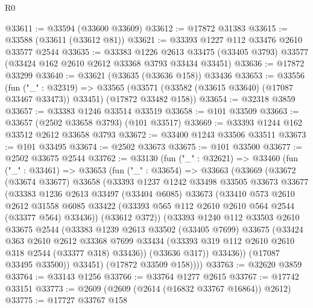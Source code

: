 \begin{lexlean}{R0}
\begin{coremodule}
@33611 := @33594 (@33600 @33609)
@33612 := @17872 @31383
@33615 := @33588 (@33611 (@33612 @81))
@33621 := @33393 @1227 @112 @33476 @2610 @33577 @2544
@33635 := @33383
    @1226
    @2613
    @33475
    (@33405 @3793)
    @33577
    (@33424 @162 @2610 @2612 @33368 @3793 @33434 @33451)
@33636 := @17872 @33299
@33640 := @33621 (@33635 (@33636 @158)) @33436
@33653 := @33556
    (fun ("_" : @32319) =>
    @33565 (@33571 (@33582 (@33615 @33640) (@17087 @33467 @33473)) @33451) (@17872 @33482 @158))
@33654 := @32318 @3859
@33657 := @33383 @1246 @33514 @33519
@33658 := @101 @33509
@33663 := @33657 (@2502 @33658 @3793) (@101 @33517)
@33669 := @33393 @1244 @162 @33512 @2612 @33658 @3793
@33672 := @33400 @1243 @33506 @33511
@33673 := @101 @33495
@33674 := @2502 @33673
@33675 := @101 @33500
@33677 := @2502 @33675 @2544
@33762 := @33130
    (fun ("_" : @32621) =>
    @33460
      (fun ("_" : @33461) =>
      @33653
        (fun ("_" : @33654) =>
        @33663
          (@33669
            (@33672
              (@33674 @33677)
              @33658
              (@33393
                @1237
                @1242
                @33498
                @33505
                @33673
                @33677
                (@33383
                  @1236
                  @2613
                  @33497
                  (@33404 @6085)
                  @33673
                  (@33410
                    @573
                    @2610
                    @2612
                    @31558
                    @6085
                    @33422
                    (@33393 @565 @112 @2610 @2610 @564 @2544 (@33377 @564) @33436))
                  (@33612 @372))
                (@33393
                  @1240
                  @112
                  @33503
                  @2610
                  @33675
                  @2544
                  (@33383
                    @1239
                    @2613
                    @33502
                    (@33405 @7699)
                    @33675
                    (@33424
                      @363
                      @2610
                      @2612
                      @33368
                      @7699
                      @33434
                      (@33393 @319 @112 @2610 @2610 @318 @2544 (@33377 @318) @33436))
                    (@33636 @317))
                  @33436))
              (@17087 @33495 @33500))
            @33451)
          (@17872 @33509 @158))))
@33763 := @32620 @3859
@33764 := @33143 @1256
@33766 := @33764 @1277 @2615
@33767 := @17742 @33151
@33773 := @2609 (@2609 (@2614 (@16832 @33767 @16864)) @2612)
@33775 := @17727 @33767 @158

\end{coremodule}
\end{lexlean}
